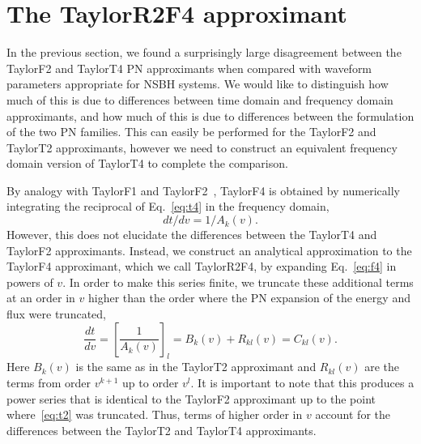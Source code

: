 



\section{The TaylorR2F4 approximant}
\label{sec:R2F4}

In the previous section, we found a surprisingly large disagreement between the TaylorF2 and TaylorT4
\ac{PN} approximants when compared with waveform parameters appropriate for
\ac{NSBH} systems. We would like to distinguish how much of this is due to
differences between time domain and frequency domain approximants, and how much
of this is due to differences between the formulation of the two \ac{PN}
families.  This can easily be performed for the TaylorF2 and TaylorT2
approximants, however we need to construct an equivalent frequency domain
version of TaylorT4 to complete the comparison.

By analogy with TaylorF1 and TaylorF2~\cite{Damour:2000zb,Buonanno:2009zt},
TaylorF4 is obtained by numerically integrating the reciprocal of Eq.~\eqref{eq:t4}
in the frequency domain,
%
\begin{equation}\label{eq:f4}
%
dt/dv = 1 / A_k(v).
%
\end{equation}
%
However, this does not elucidate the differences between the TaylorT4 and
TaylorF2 approximants. Instead, we construct an analytical approximation to the
TaylorF4 approximant, which we call TaylorR2F4, by expanding Eq.~\eqref{eq:f4} in
powers of $v$. In order to make this series finite, we truncate these
additional terms at an order in $v$ higher than the order where the \ac{PN}
expansion of the energy and flux were truncated,
%
\begin{equation}
%
\frac{dt}{dv} = \left[ \frac{1}{A_{k}(v)} \right]_l = B_{k}(v) + R_{kl}(v) =
C_{kl}(v).
%
\end{equation}
%
Here $B_{k}(v)$ is the same as in the TaylorT2 approximant and $R_{kl}(v)$ are
the terms from order $v^{k+1}$ up to order $v^l$. It is important to note that
this produces a power series that is identical to the TaylorF2 approximant up
to the point where~\eqref{eq:t2} was truncated.  Thus, terms of higher order in
$v$ account for the differences between the TaylorT2 and TaylorT4 approximants.


